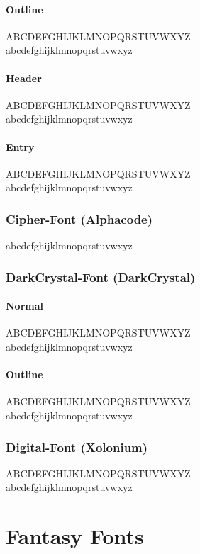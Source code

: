 \documentclass[letterpaper,openany,twoside,twocolumn]{book}
\begin{document}
	\subsubsection{Outline}
	{\newspaperHeaderOutlineFont ABCDEFGHIJKLMNOPQRSTUVWXYZ}\\
	{\newspaperHeaderOutlineFont abcdefghijklmnopqrstuvwxyz}
	\subsubsection{Header}
	{\newspaperHeaderFont ABCDEFGHIJKLMNOPQRSTUVWXYZ}\\
	{\newspaperHeaderFont abcdefghijklmnopqrstuvwxyz}
	\subsubsection{Entry}
	{\newspaperEntryFont ABCDEFGHIJKLMNOPQRSTUVWXYZ}\\
	{\newspaperEntryFont abcdefghijklmnopqrstuvwxyz}
	
	\subsection{Cipher-Font (Alphacode)}
	{\cipherfont abcdefghijklmnopqrstuvwxyz}
	
	\subsection{DarkCrystal-Font (DarkCrystal)}
	\subsubsection{Normal}
	{\darkcrystalfont ABCDEFGHIJKLMNOPQRSTUVWXYZ}\\
	{\darkcrystalfont abcdefghijklmnopqrstuvwxyz}
	\subsubsection{Outline}
	{\darkcrystaloutlinefont ABCDEFGHIJKLMNOPQRSTUVWXYZ}\\
	{\darkcrystaloutlinefont abcdefghijklmnopqrstuvwxyz}
	
	\subsection{Digital-Font (Xolonium)}
	{\digitalfont ABCDEFGHIJKLMNOPQRSTUVWXYZ}\\
	{\digitalfont abcdefghijklmnopqrstuvwxyz}
	
	
	\chapter{Fantasy Fonts}
	
\end{document}
